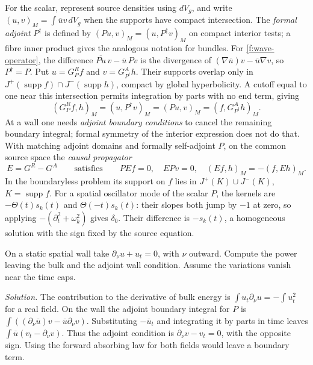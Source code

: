 For the scalar, represent source densities using $dV_g$, and write $(u,v)_M=\int\overline u v\,dV_g$ when the supports have compact intersection. The \emph{formal adjoint} $P^\dagger$ is defined by $(Pu,v)_M=(u,P^\dagger v)_M$ on compact interior tests; a fibre inner product gives the analogous notation for bundles. For \eqref{f:wave-operator}, the difference $\overline{Pu}\,v-\overline u\,Pv$ is the divergence of $(\nabla\overline u)v-\overline u\nabla v$, so $P^\dagger=P$. Put $u=G_P^R f$ and $v=G_{P^\dagger}^A h$. Their supports overlap only in $J^+(\operatorname{supp}f)\cap J^-(\operatorname{supp}h)$, compact by global hyperbolicity. A cutoff equal to one near this intersection permits integration by parts with no end term, giving
\[
 (G_P^R f,h)_M=(u,P^\dagger v)_M=(Pu,v)_M=(f,G_{P^\dagger}^A h)_M .
\]
At a wall one needs \emph{adjoint boundary conditions} to cancel the remaining boundary integral; formal symmetry of the interior expression does not do that. With matching adjoint domains and formally self-adjoint $P$, on the common source space the \emph{causal propagator}
\begin{equation}
 E=G^R-G^A\qquad\text{satisfies}\qquad PEf=0,\quad EPv=0,\quad(Ef,h)_M=-(f,Eh)_M .\label{f:causal-propagator}
\end{equation}
In the boundaryless problem its support on $f$ lies in $J^+(K)\cup J^-(K)$, $K=\operatorname{supp}f$. For a spatial oscillator mode of the scalar $P$, the kernels are $-\Theta(t)s_k(t)$ and $\Theta(-t)s_k(t)$: their slopes both jump by $-1$ at zero, so applying $-(\partial_t^2+\omega_k^2)$ gives $\delta_0$. Their difference is $-s_k(t)$, a homogeneous solution with the sign fixed by the source equation.

\begin{exercise}
On a static spatial wall take $\partial_\nu u+u_t=0$, with $\nu$ outward. Compute the power leaving the bulk and the adjoint wall condition. Assume the variations vanish near the time caps.
\end{exercise}
\noindent\emph{Solution.} The contribution to the derivative of bulk energy is $\int u_t\partial_\nu u=-\int u_t^2$ for a real field. On the wall the adjoint boundary integral for $P$ is $\int ((\partial_\nu\overline u)v-\overline u\partial_\nu v)$. Substituting $-\overline u_t$ and integrating it by parts in time leaves $\int\overline u(v_t-\partial_\nu v)$. Thus the adjoint condition is $\partial_\nu v-v_t=0$, with the opposite sign. Using the forward absorbing law for both fields would leave a boundary term.

